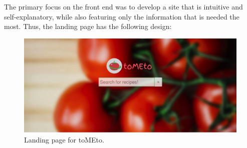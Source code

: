 \documentclass{acm_proc_article-sp}
\begin{document}
The primary focus on the front end was to develop a site that is intuitive and self-explanatory, while also featuring only the information that is needed the most. Thus, the landing page has the following design:

\begin{figure}[H]
\includegraphics[scale=0.5]{p1.png}
\caption{Landing page for toMEto.}
\end{figure}
\end{document}
